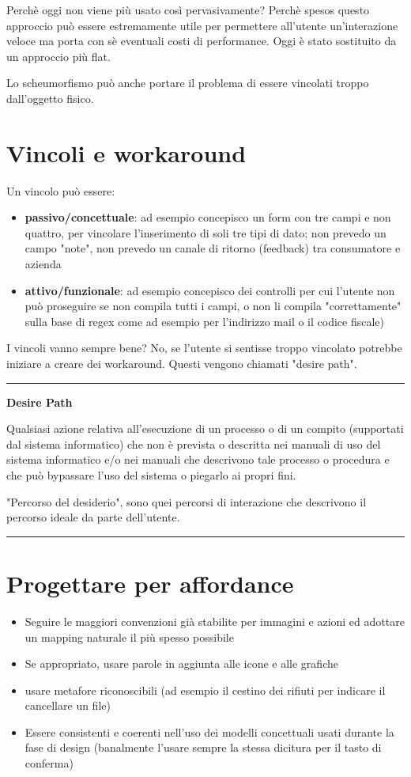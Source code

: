\documentclass[11pt,a4paper]{book}
\begin{document}
Perchè oggi non viene più usato così pervasivamente? Perchè spesos questo approccio può essere estremamente utile per permettere all'utente un'interazione veloce ma porta con sè eventuali costi di performance. Oggi è stato sostituito da un approccio più flat. 

Lo scheumorfismo può anche portare il problema di essere vincolati troppo dall'oggetto fisico.

\section{Vincoli e workaround}\label{par: workaround}
Un vincolo può essere:
\begin{itemize}
	\item \textbf{passivo/concettuale}: ad esempio concepisco un form con tre campi e non quattro, per vincolare l'inserimento di soli tre tipi di dato; non prevedo un campo "note", non prevedo un canale di ritorno (feedback) tra consumatore e azienda
	\item \textbf{attivo/funzionale}: ad esempio concepisco dei controlli per cui l'utente non può proseguire se non compila tutti i campi, o non li compila "correttamente" sulla base di regex come ad esempio per l'indirizzo mail o il codice fiscale)
\end{itemize}

I vincoli vanno sempre bene? No, se l'utente si sentisse troppo vincolato potrebbe iniziare a creare dei workaround. Questi vengono chiamati "desire path".

\noindent\rule{\textwidth}{1pt}
\begin{center}
	\textbf{Desire Path}
\end{center}

Qualsiasi azione relativa all'esecuzione di un processo o di un compito (supportati dal sistema informatico) che non è prevista o descritta nei manuali di uso del sistema informatico e/o nei manuali che descrivono tale processo o procedura e che può bypassare l'uso del sistema o piegarlo ai propri fini.

"Percorso del desiderio", sono quei percorsi di interazione che descrivono il percorso ideale da parte dell'utente.

\noindent\rule{\textwidth}{1pt}

\section{Progettare per affordance} \label{par: complessità}
\begin{itemize}
	\item Seguire le maggiori convenzioni già stabilite per immagini e azioni ed adottare un mapping naturale il più spesso possibile
	\item Se appropriato, usare parole in aggiunta alle icone e alle grafiche
	\item usare metafore riconoscibili (ad esempio il cestino dei rifiuti per indicare il cancellare un file)
	\item Essere consistenti e coerenti nell'uso dei modelli concettuali usati durante la fase di design (banalmente l'usare sempre la stessa dicitura per il tasto di conferma)
\end{itemize}
\end{document}
